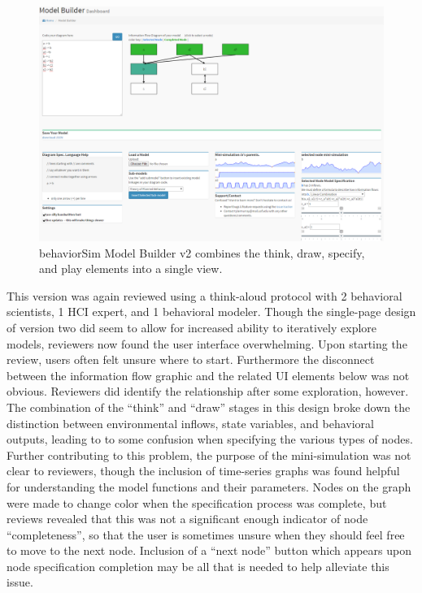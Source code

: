 \documentclass[conference]{IEEEtran}
\begin{document}
\begin{figure}[!t]
  \centering
  \includegraphics[width=0.9\columnwidth]{img/v2}  
  \caption{behaviorSim Model Builder v2 combines the think, draw, specify, and play elements into a single view.}
  \label{model-builder-v2}
\end{figure}

This version was again reviewed using a think-aloud protocol with 2 behavioral scientists, 1 HCI expert, and 1 behavioral modeler.
Though the single-page design of version two did seem to allow for increased ability to iteratively explore models, reviewers now found the user interface overwhelming.
Upon starting the review, users often felt unsure where to start.
Furthermore the disconnect between the information flow graphic and the related UI elements below was not obvious.
Reviewers did identify the relationship after some exploration, however. 
The combination of the ``think'' and ``draw'' stages in this design broke down the distinction between environmental inflows, state variables, and behavioral outputs, leading to to some confusion when specifying the various types of nodes.
Further contributing to this problem, the purpose of the mini-simulation was not clear to reviewers, though the inclusion of time-series graphs was found helpful for understanding the model functions and their parameters.
Nodes on the graph were made to change color when the specification process was complete, but reviews revealed that this was not a significant enough indicator of node ``completeness'', so that the user is sometimes unsure when they should feel free to move to the next node.
Inclusion of a ``next node'' button which appears upon node specification completion may be all that is needed to help alleviate this issue.
\end{document}
